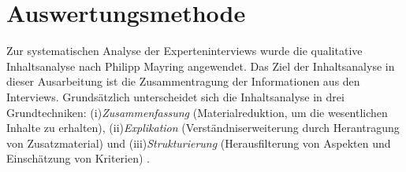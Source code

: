 
\section{Auswertungsmethode}
Zur systematischen Analyse der Experteninterviews wurde die qualitative Inhaltsanalyse nach Philipp Mayring angewendet. Das Ziel der Inhaltsanalyse in dieser Ausarbeitung ist die Zusammentragung der Informationen aus den Interviews. Grundsätzlich unterscheidet sich die Inhaltsanalyse in drei Grundtechniken: (i)\emph{Zusammenfassung} (Materialreduktion, um die wesentlichen Inhalte zu erhalten), (ii)\emph{Explikation} (Verständniserweiterung durch Herantragung von Zusatzmaterial) und (iii)\emph{Strukturierung} (Herausfilterung von Aspekten und Einschätzung von Kriterien) \cite{mayring1994qualitative}.\\

